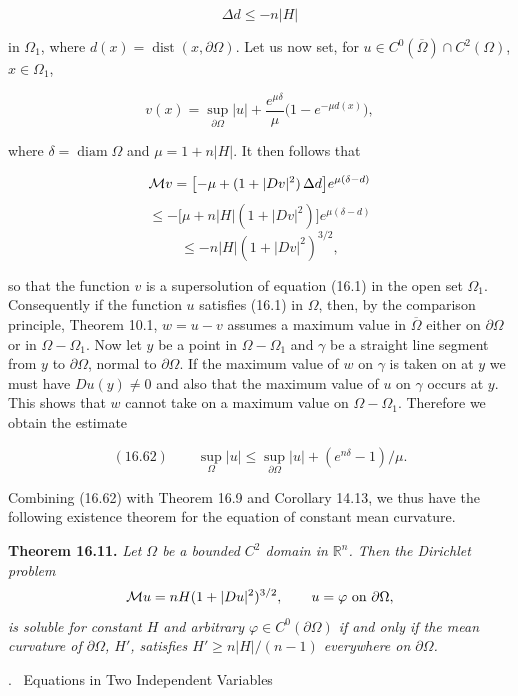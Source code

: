\[
\Delta d \le -n|H|
\]

in $\Omega_1$, where $d(x)=\operatorname{dist}(x,\partial\Omega)$. Let us now set, for $u \in C^0(\overline{\Omega}) \cap C^2(\Omega)$, $x \in \Omega_1$,

\[
 v(x)=\sup_{\partial\Omega}|u|+\frac{e^{\mu\delta}}{\mu}\bigl(1-e^{-\mu d(x)}\bigr),
\]

where $\delta=\operatorname{diam}\Omega$ and $\mu=1+n|H|$. It then follows that

\[
\mathcal{M} v = \bigl[-\mu + (1+|Dv|^2)\,\Delta d\bigr]e^{\mu(\delta-d)}
\]
\[
\le -\bigl[\mu+n|H|(1+|Dv|^2)\bigr]e^{\mu(\delta-d)}
\]
\[
\le -n|H|(1+|Dv|^2)^{3/2},
\]

so that the function $v$ is a supersolution of equation (16.1) in the open set $\Omega_1$. Consequently if the function $u$ satisfies (16.1) in $\Omega$, then, by the comparison principle,
Theorem 10.1, $w=u-v$ assumes a maximum value in $\overline{\Omega}$ either on $\partial\Omega$ or in $\Omega-\Omega_1$.
Now let $y$ be a point in $\Omega-\Omega_1$ and $\gamma$ be a straight line segment from $y$ to $\partial\Omega$,
normal to $\partial\Omega$. If the maximum value of $w$ on $\gamma$ is taken on at $y$ we must have
$Du(y)\neq 0$ and also that the maximum value of $u$ on $\gamma$ occurs at $y$. This shows that $w$
cannot take on a maximum value on $\Omega-\Omega_1$. Therefore we obtain the estimate

\begin{equation}
(16.62) \qquad \sup_{\Omega}|u| \le \sup_{\partial\Omega}|u| + (e^{n\delta}-1)/\mu.
\end{equation}

Combining (16.62) with Theorem 16.9 and Corollary 14.13, we thus have the
following existence theorem for the equation of constant mean curvature.

\begin{center}
\textbf{Theorem 16.11.}  \emph{Let $\Omega$ be a bounded $C^2$ domain in $\mathbb{R}^n$. Then the Dirichlet problem}
\[
\mathcal{M} u=nH(1+|Du|^2)^{3/2},\qquad u=\varphi \text{ on } \partial\Omega,
\]
\emph{is soluble for constant $H$ and arbitrary $\varphi \in C^0(\partial\Omega)$ if and only if the mean curvature of $\partial\Omega$, $H'$, satisfies $H'\ge n|H|/(n-1)$ everywhere on $\partial\Omega$.}
\end{center}


. \ Equations in Two Independent Variables

